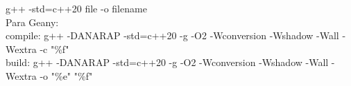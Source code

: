 \begin{code}
g++ -std=c++20 {file} -o {filename} \\
Para Geany: \\
compile: g++ -DANARAP -std=c++20 -g -O2 -Wconversion -Wshadow -Wall -Wextra -c "\%f" \\
build:   g++ -DANARAP -std=c++20 -g -O2 -Wconversion -Wshadow -Wall -Wextra -o "\%e" "\%f"  
\end{code}